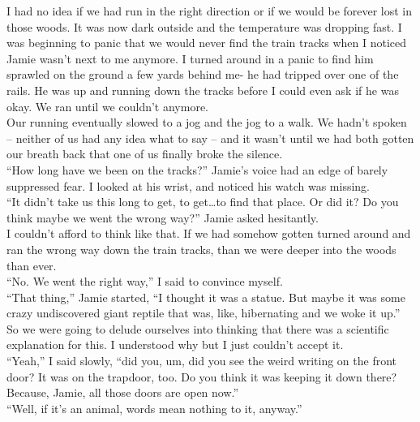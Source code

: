 \documentclass[a5paper]{scrartcl}
\begin{document}
I had no idea if we had run in the right direction or if we would be forever lost in those woods. It was now dark outside and the temperature was dropping fast. I was beginning to panic that we would never find the train tracks when I noticed Jamie wasn't next to me anymore. I turned around in a panic to find him sprawled on the ground a few yards behind me- he had tripped over one of the rails. He was up and running down the tracks before I could even ask if he was okay. We ran until we couldn't anymore.\\


Our running eventually slowed to a jog and the jog to a walk. We hadn't spoken – neither of us had any idea what to say – and it wasn't until we had both gotten our breath back that one of us finally broke the silence.\\


\enquote{How long have we been on the tracks?} Jamie's voice had an edge of barely suppressed fear. I looked at his wrist, and noticed his watch was missing.\\


\enquote{It didn't take us this long to get, to get\dots to find that place. Or did it? Do you think maybe we went the wrong way?} Jamie asked hesitantly.\\


I couldn't afford to think like that. If we had somehow gotten turned around and ran the wrong way down the train tracks, than we were deeper into the woods than ever.\\


\enquote{No. We went the right way,} I said to convince myself.\\


\enquote{That thing,} Jamie started, \enquote{I thought it was a statue. But maybe it was some crazy undiscovered giant reptile that was, like, hibernating and we woke it up.}\\


So we were going to delude ourselves into thinking that there was a scientific explanation for this. I understood why but I just couldn't accept it.\\


\enquote{Yeah,} I said slowly, \enquote{did you, um, did you see the weird writing on the front door? It was on the trapdoor, too. Do you think it was keeping it down there? Because, Jamie, all those doors are open now.}\\


\enquote{Well, if it's an animal, words mean nothing to it, anyway.}\\
\end{document}
